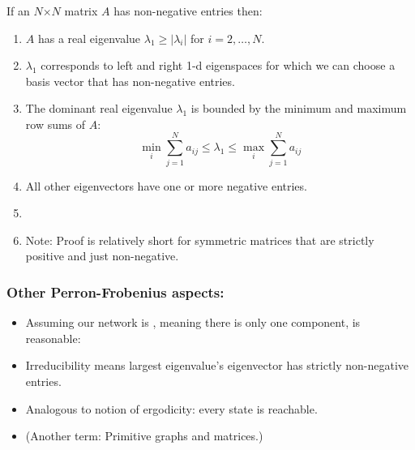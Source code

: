 \begin{frame}
  \frametitle{}

  \begin{block}{If an $N$$\times$$N$ matrix $A$ has non-negative entries then:}
    \begin{enumerate}
    \item<2-> 
      $A$ has a real eigenvalue $\lambda_1 \ge |\lambda_i|$ for $i=2,\ldots,N$.
    \item<3-> 
      $\lambda_1$ corresponds to left and right 1-d eigenspaces
      for which we can choose a basis vector that has non-negative entries.
    \item<4-> 
      The dominant real eigenvalue $\lambda_1$ is bounded
      by the minimum and maximum row sums of $A$:
      $$
      \min_{i} \sum_{j=1}^{N} a_{ij}
      \le 
      \lambda_1
      \le 
      \max_{i} \sum_{j=1}^{N} a_{ij}
      $$
    \item<5-> 
      All other eigenvectors have one or more negative entries.
    \item<6-> 
    \item<7-> 
      Note: Proof is relatively short for symmetric
      matrices that are strictly positive\cite{ninio1976a}
      and just non-negative\cite{lin1977a}.
    \end{enumerate}
  \end{block}

\end{frame}

\begin{frame}
  \frametitle{Other Perron-Frobenius aspects:}

  \begin{itemize}
  \item<1->
    Assuming our network is 
    ,
    meaning there is only one component, is reasonable:
  \item<3->
    Irreducibility means largest eigenvalue's eigenvector
    has strictly non-negative entries.
  \item<4->
    Analogous to notion of ergodicity: every state is reachable.
  \item<5->
    (Another term: \alert{Primitive} graphs and matrices.)
  \end{itemize}

\end{frame}


